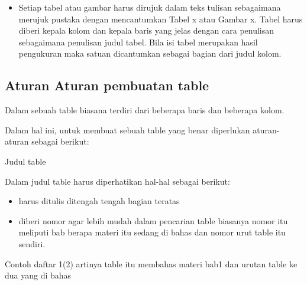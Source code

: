\begin{itemize}
\vspace{\baselineskip}
	\item Setiap tabel atau gambar harus dirujuk dalam teks tulisan sebagaimana merujuk pustaka dengan mencantumkan Tabel x atau Gambar x. Tabel harus diberi kepala kolom dan kepala baris yang jelas dengan cara penulisan sebagaimana penulisan judul tabel. Bila isi tabel merupakan hasil pengukuran maka satuan dicantumkan sebagai bagian dari judul kolom.

\end{itemize}\par

\vspace{\baselineskip}
\subsection{Aturan Aturan pembuatan table}

\vspace{\baselineskip}

Dalam sebuah table biasana terdiri dari beberapa baris dan beberapa kolom.\par

\vspace{\baselineskip}

Dalam hal ini, untuk membuat sebuah table yang benar diperlukan aturan-aturan sebagai berikut:\par

\vspace{\baselineskip}

\noindent Judul table\par


\noindent Dalam judul table harus diperhatikan hal-hal sebagai berikut:\par

\begin{itemize}
	\vspace{\baselineskip}
	\item harus ditulis ditengah tengah bagian teratas\par

\vspace{\baselineskip}
	\item diberi nomor agar lebih mudah dalam pencarian table biasanya nomor itu meliputi bab berapa materi itu sedang di bahas dan nomor urut table itu sendiri.
	
\end{itemize}\par

\vspace{\baselineskip}
\noindent Contoh daftar 1(2) artinya table itu membahas materi bab1 dan urutan table ke dua yang di bahas\par

